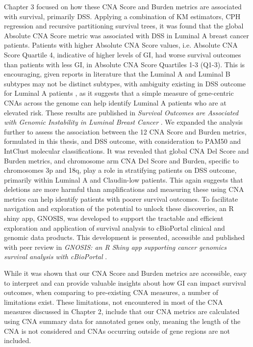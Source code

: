 Chapter 3 focused on how these CNA Score and Burden metrics are associated with survival, primarily DSS. Applying a combination of KM estimators, CPH regression and recursive partitioning survival trees, it was found that the global Absolute CNA Score metric was associated with DSS in Luminal A breast cancer patients. Patients with higher Absolute CNA Score values, i.e. Absolute CNA Score Quartile 4, indicative of higher levels of GI, had worse survival outcomes than patients with less GI, in Absolute CNA Score Quartiles 1-3 (Q1-3). This is encouraging, given reports in literature that the Luminal A and Luminal B subtypes may not be distinct subtypes, with ambiguity existing in DSS outcome for Luminal A patients \citep{pmid27341628, pmid26679376, pmid30849944, pmid37253056}, as it suggests that a simple measure of gene-centric CNAs across the genome can help identify Luminal A patients who are at elevated risk. These results are published in \textit{Survival Outcomes are Associated with Genomic Instability in Luminal Breast Cancer} \citep{King_2021}. We expanded the analysis further to assess the association between the 12 CNA Score and Burden metrics, formulated in this thesis, and DSS outcome, with consideration to PAM50 and IntClust molecular classifications. It was revealed that global CNA Del Score and Burden metrics, and chromosome arm CNA Del Score and Burden, specific to chromosomes 3p and 18q, play a role in stratifying patients on DSS outcome, primarily within Luminal A and Claudin-low patients. This again suggests that deletions are more harmful than amplifications and measuring these using CNA metrics can help identify patients with poorer survival outcomes. To facilitate navigation and exploration of the potential to unlock these discoveries, an R shiny app, GNOSIS, was developed to support the tractable and efficient exploration and application of survival analysis to cBioPortal clinical and genomic data products. This development is presented, accessible and published with peer review in \textit{GNOSIS: an R Shiny app supporting cancer genomics survival analysis with cBioPortal} \citep{King_GNOSIS}. 

While it was shown that our CNA Score and Burden metrics are accessible, easy to interpret and can provide valuable insights about how GI can impact survival outcomes, when comparing to pre-existing CNA measures, a number of limitations exist. These limitations, not encountered in most of the CNA measures discussed in Chapter 2, include that our CNA metrics are calculated using CNA summary data for annotated genes only, meaning the length of the CNA is not considered and CNAs occurring outside of gene regions are not included.  

